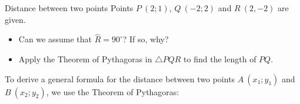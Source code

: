 \begin{activity}{Distance between two points}
Points $P~(2;1)$, $Q~(-2;2)$ and $R~(2,-2)$ are given. 
\begin{itemize}
 \item Can we assume that $\hat{R}=90^{\circ}$? If so, why?
\item Apply the Theorem of Pythagoras in $\triangle PQR$ to find the length of $PQ$.
\end{itemize}


\setcounter{subfigure}{0}
\begin{figure}[H] %
\begin{center}
\end{center}
\label{fig:trianglePQR}
\end{figure} 
\end{activity}       
%       
To derive a general formula for the distance between two points $A~({x}_{1};{y}_{1})$ and $B~({x}_{2};{y}_{2})$, we use the Theorem of Pythagoras:\par 

